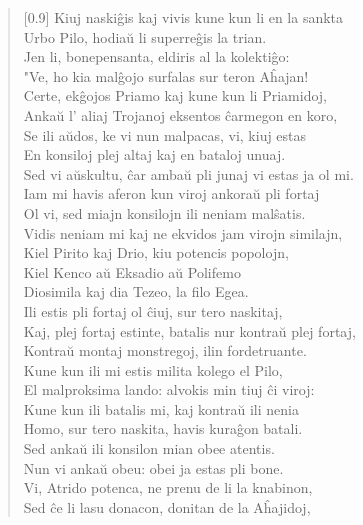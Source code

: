 \begin{verse}[0.9\textwidth]
          Kiuj naski\^gis kaj vivis kune kun li en la sankta\\
          Urbo Pilo, hodia\u u li superre\^gis la trian.\\
          Jen li, bonepensanta, eldiris al la kolekti\^go:\\
          "Ve, ho kia mal\^gojo surfalas sur teron A\^hajan!\\
          Certe, ek\^gojos Priamo kaj kune kun li Priamidoj,\\
          Anka\u u l' aliaj Trojanoj eksentos \^carmegon en koro,\\
          Se ili a\u udos, ke vi nun malpacas, vi, kiuj estas\\
          En konsiloj plej altaj kaj en bataloj unuaj.\\
          Sed vi a\u uskultu, \^car amba\u u pli junaj vi estas ja ol mi.\\
          Iam mi havis aferon kun viroj ankora\u u pli fortaj\\
          Ol vi, sed miajn konsilojn ili neniam mal\^satis.\\
          Vidis neniam mi kaj ne ekvidos jam virojn similajn,\\
          Kiel Pirito kaj Drio, kiu potencis popolojn,\\
          Kiel Kenco a\u u Eksadio a\u u Polifemo\\
          Diosimila kaj dia Tezeo, la filo Egea.\\
          Ili estis pli fortaj ol \^ciuj, sur tero naskitaj,\\
          Kaj, plej fortaj estinte, batalis nur kontra\u u plej fortaj,\\
          Kontra\u u montaj monstregoj, ilin fordetruante.\\
          Kune kun ili mi estis milita kolego el Pilo,\\
          El malproksima lando: alvokis min tiuj \^ci viroj:\\
          Kune kun ili batalis mi, kaj kontra\u u ili nenia\\
          Homo, sur tero naskita, havis kura\^gon batali.\\
          Sed anka\u u ili konsilon mian obee atentis.\\
          Nun vi anka\u u obeu: obei ja estas pli bone.\\
          Vi, Atrido potenca, ne prenu de li la knabinon,\\
          Sed \^ce li lasu donacon, donitan de la A\^hajidoj,\\

\end{verse}
